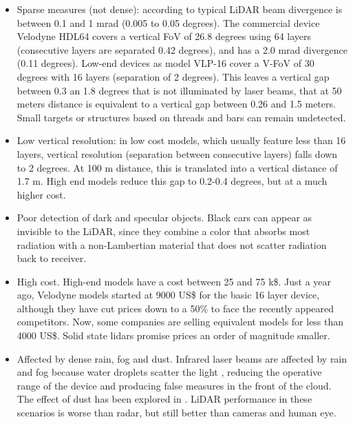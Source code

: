\begin{itemize}
    \item Sparse measures (not dense): according to \cite{Gatziolis2008} typical
    LiDAR beam divergence is between 0.1 and 1 mrad (0.005 to 0.05 degrees). 
    The commercial device Velodyne HDL64 covers a vertical FoV of 26.8 degrees 
    using 64 layers (consecutive layers are separated 0.42 degrees), and has a
    2.0 mrad divergence \cite{Glennie2010} (0.11 degrees). Low-end devices as 
    model VLP-16 cover a V-FoV of 30 degrees with 16 layers (separation of 2 
    degrees). This leaves a vertical gap between 0.3 an 1.8 degrees that is not
    illuminated by laser beams, that at 50 meters distance is equivalent to a 
    vertical gap between 0.26 and 1.5 meters. Small targets or structures based 
    on threads and bars can remain undetected.
    
    \item Low vertical resolution: in low cost models, which usually feature 
    less than 16 layers, vertical resolution (separation between consecutive
    layers) falls down to 2 degrees. At 100 m distance, this is translated into 
    a vertical distance of 1.7 m. High end models reduce this gap to 0.2-0.4 
    degrees, but at a much higher cost.
    
    \item Poor detection of dark and specular objects. Black cars
    can appear as invisible to the LiDAR, since they combine a color that
    absorbs most radiation with a non-Lambertian material that does not scatter
    radiation back to receiver.
    
    \item High cost. High-end models have a cost between 25 and 75 k\$.
    Just a year ago, Velodyne models started at 9000 US\$ for the basic 16
    layer device, although they have cut prices down to a 50\% to face the
    recently appeared competitors. Now, some companies are selling
    equivalent models for less than 4000 US\$. Solid state lidars promise
    prices an order of magnitude smaller.
    
    \item Affected by dense rain, fog and dust. Infrared laser
    beams are affected by rain and fog because water droplets scatter the light 
    \cite{Wang2008}, reducing the operative range of the device and producing 
    false measures in the front of the cloud. The effect of dust has been
    explored in \cite{Phillips2017}. LiDAR performance in these scenarios is 
    worse than radar, but still better than cameras and human eye.
\end{itemize}


